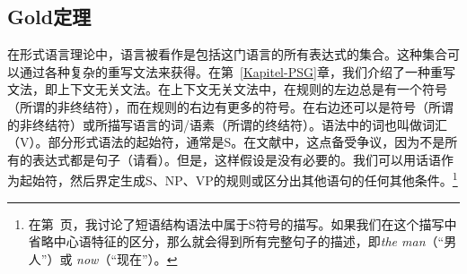 \subsection{Gold定理}
\label{Abschnitt-Golds-Theorem}

在形式语言理论中，语言被看作是包括这门语言的所有表达式的集合。这种集合可以通过各种复杂的重写文法来获得。在第~\ref{Kapitel-PSG}章，我们介绍了一种重写文法，即上下文无关文法。在上下文无关文法中，在规则的左边总是有一个符号（所谓的非终结符），而在规则的右边有更多的符号。在右边还可以是符号（所谓的非终结符）或所描写语言的词/语素（所谓的终结符）。语法中的词也叫做词汇（V）。部分形式语法的起始符，通常是S。在文献中，这点备受争议，因为不是所有的表达式都是句子（请看\citealp[]{Deppermann2006a}）。但是，这样假设是没有必要的。我们可以用话语作为起始符，然后界定生成S、NP、VP的规则或区分出其他语句的任何其他条件。\footnote{
在第~\pageref{HPSG-Rootnode}页，我讨论了短语结构语法中属于S符号的描写。如果我们在这个描写中省略中心语特征的区分，那么就会得到所有完整句子的描述，即\emph{the man}（“男人”）或 \emph{now}（“现在”）。
}

